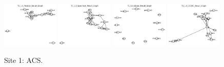 \begin{figure}
    \includegraphics[width=0.24\textwidth]{diss/7_cond/figs/T1_1.0_Pearson_Result_Graph.png}
    \includegraphics[width=0.24\textwidth]{diss/7_cond/figs/T1_1.0_Spearman_Result_Graph.png}
    \includegraphics[width=0.24\textwidth]{diss/7_cond/figs/T1_1.0_Glasso_Result_Graph.png}
    \includegraphics[width=0.24\textwidth]{diss/7_cond/figs/T1_1.0_CODEC_Result_Graph.png}
    \caption{Site 1: ACS.}
    \label{fig:site1}
\end{figure}


